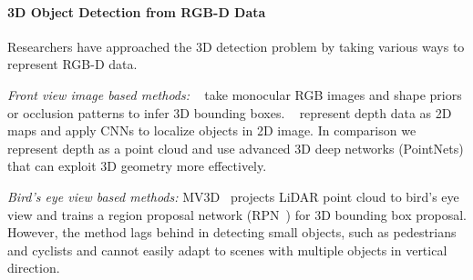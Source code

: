 \paragraph{3D Object Detection from RGB-D Data} Researchers have approached the 3D detection problem by taking various ways to represent RGB-D data.

\emph{Front view image based methods:} ~\cite{chen2016monocular, mousavian20163d, xiang2015data} take monocular RGB images and shape priors or occlusion patterns to infer 3D bounding boxes. ~\cite{li2016vehicle, deng2017amodal} represent depth data as 2D maps and apply CNNs to localize objects in 2D image. In comparison we represent depth as a point cloud and use advanced 3D deep networks (PointNets) that can exploit 3D geometry more effectively.

\emph{Bird's eye view based methods:} MV3D~\cite{cvpr17chen} projects LiDAR point cloud to bird's eye view and trains a region proposal network (RPN~\cite{ren2015faster}) for 3D bounding box proposal. However, the method lags behind in detecting small objects, such as pedestrians and cyclists and cannot easily adapt to scenes with multiple objects in vertical direction.

